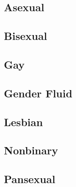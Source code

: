 \subsection*{Asexual}


\subsection*{Bisexual}


\subsection*{Gay}


\subsection*{Gender Fluid}


\subsection*{Lesbian}


\subsection*{Nonbinary}


\subsection*{Pansexual}
